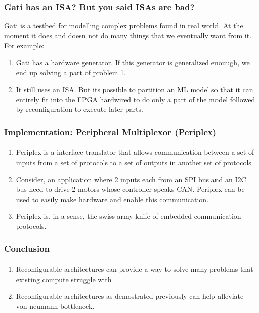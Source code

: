 \documentclass{beamer}
\begin{document}
\begin{frame}[fragile]
  \frametitle{Gati has an ISA? But you said ISAs are bad?}
  Gati is a testbed for modelling complex problems found in real world.
  At the moment it does and doesn not do many things that we eventually want
  from it.
  For example:
  \begin{enumerate}
    \item Gati has a hardware generator. If this generator is generalized
      enouugh, we end up solving a part of problem 1.
    \item It still uses an ISA. But its possible to partition an ML
      model so that it can entirely fit into 
      the FPGA hardwired to do only a part of the model followed by
      reconfiguration to execute later parts.
  \end{enumerate}
\end{frame}

\begin{frame}[fragile]
  \frametitle{Implementation: Peripheral Multiplexor (Periplex)}
  \framesubtitle{}

  \begin{enumerate}
    \item Periplex is a interface translator that allows communication
      between a set of inputs from a set of protocols to a set of outputs
      in another set of protocols
    \item Consider, an application where 2 inputs each from an SPI bus and an
      I2C bus need to drive 2 motors whose controller speaks CAN. Periplex can
      be used to easily make hardware and enable this communication.
    \item Periplex is, in a sense, the swiss army knife of embedded
      communication protocols.
  \end{enumerate}
\end{frame}

\begin{frame}[fragile]
  \frametitle{Conclusion}
  \framesubtitle{}

  \begin{enumerate}
    \item Reconfigurable architectures can provide a way to solve many problems
      that existing compute struggle with
    \item Reconfigurable architectures as demostrated previously can help
      alleviate von-neumann bottleneck.
  \end{enumerate}
\end{frame}
\end{document}
